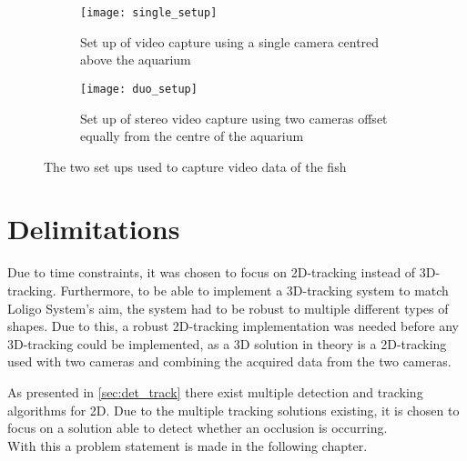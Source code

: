 \begin{figure}
	\centering
	\begin{subfigure}{0.4\textwidth}
		\texttt{[image: single\_setup]}
		\caption{Set up of video capture using a single camera centred above the aquarium}
		\label{fig:single_setup}
	\end{subfigure}
	\begin{subfigure}{0.4\textwidth}
		\texttt{[image: duo\_setup]}
		\caption{Set up of stereo video capture using two cameras offset equally from the centre of the aquarium}
		\label{fig:duo_setup}
	\end{subfigure}
\caption{The two set ups used to capture video data of the fish}
\label{fig:cam_setup}
\end{figure}

\section{Delimitations}
Due to time constraints, it was chosen to focus on 2D-tracking instead of 3D-tracking. Furthermore, to be able to implement a 3D-tracking system to match Loligo System's aim, the system had to be robust to multiple different types of shapes. Due to this, a robust 2D-tracking implementation was needed before any 3D-tracking could be implemented, as a 3D solution in theory is a 2D-tracking used with two cameras and combining the acquired data from the two cameras.

As presented in \autoref{sec:det_track} there exist multiple detection and tracking algorithms for 2D. Due to the multiple tracking solutions existing, it is chosen to focus on a solution able to detect whether an occlusion is occurring.\\

With this a problem statement is made in the following chapter.